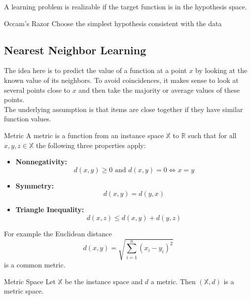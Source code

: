 \documentclass[english]{panikzettel}
\begin{document}
A learning problem is realizable if the target function is in the hypothesis space.

\begin{defi}{Occam's Razor}
Choose the simplest hypothesis consistent with the data
\end{defi}


\subsection{Nearest Neighbor Learning}
The idea here is to predict the value of a function at a point $x$ by looking at the known value of its neighbors. To avoid coincidences, it makes sense to look at several points close to $x$ and then take the majority or average values of these points.\\
The underlying assumption is that items are close together if they have similar function values.

\begin{halfboxl}
\vspace{-\baselineskip}
\begin{defi}{Metric}
A metric is a function from an instance space $\mathbb{X}$ to $\mathbb{R}$ such that for all $x,y,z\in\mathbb{X}$ the following three properties apply:
\begin{itemize}
\item \textbf{Nonnegativity:}
\vspace{-0.5\baselineskip}
\[
d(x,y)\geq 0 \text{ and } d(x,y)=0 \iff x=y
\]
\item \textbf{Symmetry:}
\vspace{-0.5\baselineskip}
\[
d(x,y)=d(y,x)
\]
\item \textbf{Triangle Inequality:}
\vspace{-0.5\baselineskip}
\[
d(x,z)\leq d(x,y)+d(y,z)
\]
\end{itemize}
\end{defi}
\end{halfboxl}
\begin{halfboxr}
\vspace{-\baselineskip}
For example the Euclidean distance
\[
d(x,y)=\sqrt{\sum_{i=1}^n(x_i-y_i)^2}
\]
is a common metric.\\


\begin{defi}{Metric Space}
Let $\mathbb{X}$ be the instance space and $d$ a metric. Then $(\mathbb{X}, d)$ is a metric space.
\end{defi}
\end{halfboxr}
\end{document}
